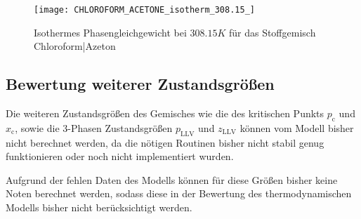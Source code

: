 \documentclass[../thesis.tex]{subfiles}
\begin{document}
\begin{figure}[hbt]
	\centering
	\texttt{[image: CHLOROFORM\_ACETONE\_isotherm\_308.15\_]}
	\caption{Isothermes Phasengleichgewicht bei $ 308$.$15 K$ für das Stoffgemisch Chloroform|Azeton}
	\label{fig: druckminimumazeotrop}
\end{figure}

\subsection{Bewertung weiterer Zustandsgrößen}

Die weiteren Zustandsgrößen des Gemisches wie die des kritischen Punkts $ p_{\mathrm{c}}$ und $ x_{\mathrm{c}}$, sowie die 3-Phasen Zustandsgrößen $p_{\mathrm{LLV}}$ und $z_{\mathrm{LLV}}$ können vom Modell bisher nicht berechnet werden, da die nötigen Routinen bisher nicht stabil genug funktionieren oder noch nicht implementiert wurden.

Aufgrund der fehlen Daten des Modells können für diese Größen bisher keine Noten berechnet werden, sodass diese in der Bewertung des thermodynamischen Modells bisher nicht berücksichtigt werden.
\end{document}
